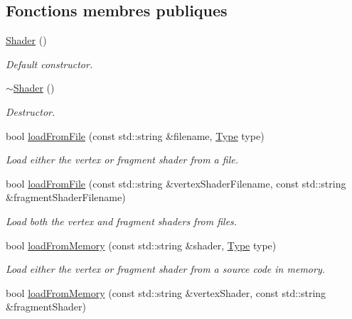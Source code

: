 \subsection*{Fonctions membres publiques}
\begin{DoxyCompactItemize}
\item 
\hyperlink{classsf_1_1Shader_a1d7f28f26b4122959fcafec871c2c3c5}{Shader} ()
\begin{DoxyCompactList}\small\item\em Default constructor. \end{DoxyCompactList}\item 
\mbox{\label{classsf_1_1Shader_a4bac6cc8b046ecd8fb967c145a2380e6}} 
\hyperlink{classsf_1_1Shader_a4bac6cc8b046ecd8fb967c145a2380e6}{$\sim$\+Shader} ()
\begin{DoxyCompactList}\small\item\em Destructor. \end{DoxyCompactList}\item 
bool \hyperlink{classsf_1_1Shader_a053a5632848ebaca2fcd8ba29abe9e6e}{load\+From\+File} (const std\+::string \&filename, \hyperlink{classsf_1_1Shader_afaa1aa65e5de37b74d047da9def9f9b3}{Type} type)
\begin{DoxyCompactList}\small\item\em Load either the vertex or fragment shader from a file. \end{DoxyCompactList}\item 
bool \hyperlink{classsf_1_1Shader_ac9d7289966fcef562eeb92271c03e3dc}{load\+From\+File} (const std\+::string \&vertex\+Shader\+Filename, const std\+::string \&fragment\+Shader\+Filename)
\begin{DoxyCompactList}\small\item\em Load both the vertex and fragment shaders from files. \end{DoxyCompactList}\item 
bool \hyperlink{classsf_1_1Shader_ac92d46bf71dff2d791117e4e472148aa}{load\+From\+Memory} (const std\+::string \&shader, \hyperlink{classsf_1_1Shader_afaa1aa65e5de37b74d047da9def9f9b3}{Type} type)
\begin{DoxyCompactList}\small\item\em Load either the vertex or fragment shader from a source code in memory. \end{DoxyCompactList}\item 
bool \hyperlink{classsf_1_1Shader_ae34e94070d7547a890166b7993658a9b}{load\+From\+Memory} (const std\+::string \&vertex\+Shader, const std\+::string \&fragment\+Shader)

\end{DoxyCompactItemize}
